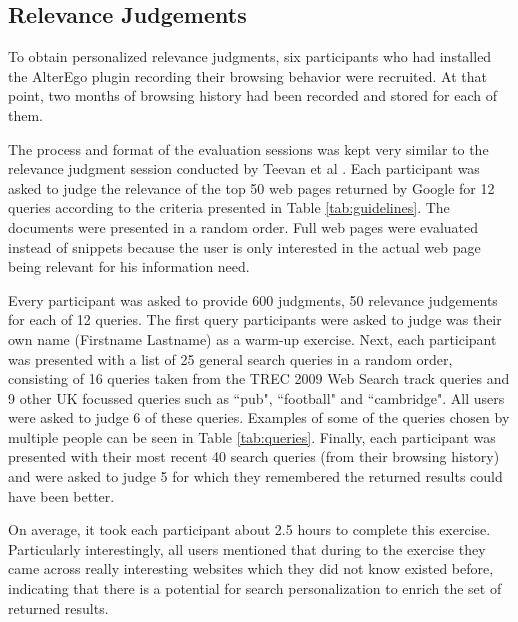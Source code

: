 \documentclass{sig-alternate}
\begin{document}
\subsection{Relevance Judgements}

To obtain personalized relevance judgments, six participants who had installed the AlterEgo plugin recording their browsing behavior were recruited. At that point, two months of browsing history had been recorded and stored for each of them. 

The process and format of the evaluation sessions was kept very similar to the relevance judgment session conducted by Teevan et al \cite{Teevan:Main}. Each participant was asked to judge the relevance of the top 50 web pages returned by Google for 12 queries according to the criteria presented in Table \ref{tab:guidelines}. The documents were presented in a random order. Full web pages were evaluated instead of snippets because the user is only interested in the actual web page being relevant for his information need.

Every participant was asked to provide 600 judgments, 50 relevance judgements for each of 12 queries. The first query participants were asked to judge was their own name (Firstname Lastname) as a warm-up exercise. Next, each participant was presented with a list of 25 general search queries in a random order, consisting of 16 queries taken from the TREC 2009 Web Search track queries and 9 other UK focussed queries such as ``pub", ``football" and ``cambridge". All users were asked to judge 6 of these queries. Examples of some of the queries chosen by multiple people can be seen in Table \ref{tab:queries}. Finally, each participant was presented with their most recent 40 search queries (from their browsing history) and were asked to judge 5 for which they remembered the returned results could have been better.

On average, it took each participant about 2.5 hours to complete this exercise. Particularly interestingly, all users mentioned that during to the exercise they came across really interesting websites which they did not know existed before, indicating that there is a potential for search personalization to enrich the set of returned results.
\end{document}
